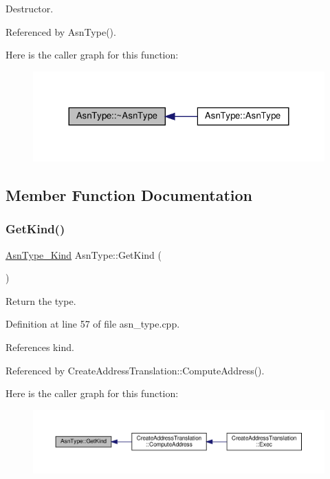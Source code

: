 Destructor. 



Referenced by Asn\+Type().

Here is the caller graph for this function\+:
\nopagebreak
\begin{figure}[H]
\begin{center}
\leavevmode
\includegraphics[width=324pt]{db/d35/classAsnType_aefbf788bb09a371193c8b3524322d62a_icgraph}
\end{center}
\end{figure}


\subsection{Member Function Documentation}
\mbox{\label{classAsnType_a95aeacad529482040c59c91002aaed26}} 
\subsubsection{\texorpdfstring{Get\+Kind()}{GetKind()}}
{\footnotesize\ttfamily \hyperlink{asn__type_8hpp_a8d6021a223e1d3f16d93cac2f5ab45c3}{Asn\+Type\+\_\+\+Kind} Asn\+Type\+::\+Get\+Kind (\begin{DoxyParamCaption}{ }\end{DoxyParamCaption})}



Return the type. 



Definition at line 57 of file asn\+\_\+type.\+cpp.



References kind.



Referenced by Create\+Address\+Translation\+::\+Compute\+Address().

Here is the caller graph for this function\+:
\nopagebreak
\begin{figure}[H]
\begin{center}
\leavevmode
\includegraphics[width=350pt]{db/d35/classAsnType_a95aeacad529482040c59c91002aaed26_icgraph}
\end{center}
\end{figure}


